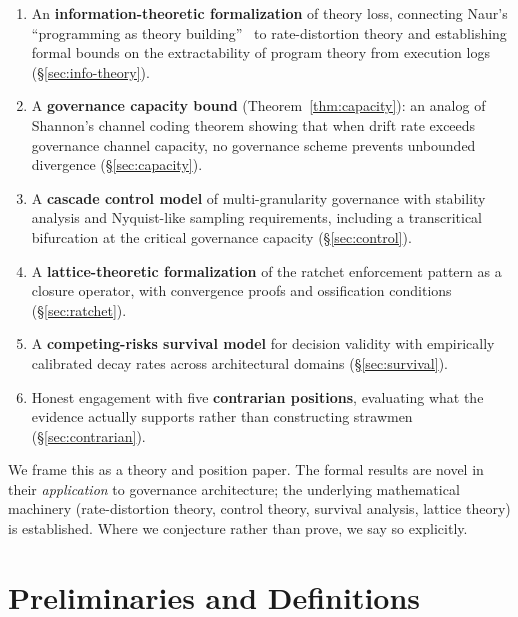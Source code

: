 \documentclass[11pt, a4paper, logo, copyright]{googledeepmind}
\begin{document}
\begin{enumerate}
    \item An \textbf{information-theoretic formalization} of theory loss, connecting Naur's ``programming as theory building''~\citep{naur1985} to rate-distortion theory and establishing formal bounds on the extractability of program theory from execution logs (\S\ref{sec:info-theory}).

    \item A \textbf{governance capacity bound} (Theorem~\ref{thm:capacity}): an analog of Shannon's channel coding theorem showing that when drift rate exceeds governance channel capacity, no governance scheme prevents unbounded divergence (\S\ref{sec:capacity}).

    \item A \textbf{cascade control model} of multi-granularity governance with stability analysis and Nyquist-like sampling requirements, including a transcritical bifurcation at the critical governance capacity (\S\ref{sec:control}).

    \item A \textbf{lattice-theoretic formalization} of the ratchet enforcement pattern as a closure operator, with convergence proofs and ossification conditions (\S\ref{sec:ratchet}).

    \item A \textbf{competing-risks survival model} for decision validity with empirically calibrated decay rates across architectural domains (\S\ref{sec:survival}).

    \item Honest engagement with five \textbf{contrarian positions}, evaluating what the evidence actually supports rather than constructing strawmen (\S\ref{sec:contrarian}).
\end{enumerate}

We frame this as a theory and position paper. The formal results are novel in their \emph{application} to governance architecture; the underlying mathematical machinery (rate-distortion theory, control theory, survival analysis, lattice theory) is established. Where we conjecture rather than prove, we say so explicitly.


\section{Preliminaries and Definitions}
\label{sec:prelim}
\end{document}
